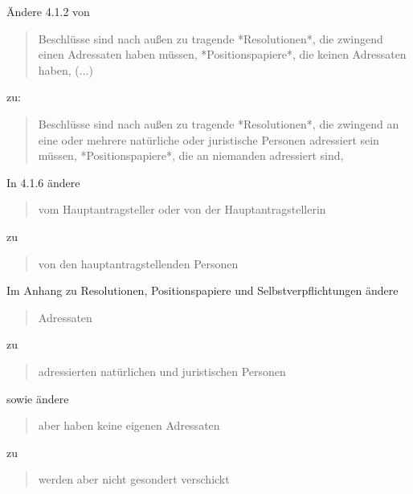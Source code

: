 \documentclass[draft,10pt,oneside]{scrartcl}
\begin{document}
Ändere 4.1.2 von
\begin{quote}
    Beschlüsse sind nach außen zu tragende *Resolutionen*, die zwingend einen
    Adressaten haben müssen, *Positionspapiere*, die keinen Adressaten haben, (...)
\end{quote}
zu:
\begin{quote}
    Beschlüsse sind nach außen zu tragende *Resolutionen*, die zwingend an
    eine oder mehrere natürliche oder juristische Personen adressiert sein
    müssen, *Positionspapiere*, die an niemanden adressiert sind,
\end{quote}

In 4.1.6 ändere
\begin{quote}
    vom Hauptantragsteller oder von der Hauptantragstellerin
\end{quote}
zu
\begin{quote}
    von den hauptantragstellenden Personen
\end{quote}

Im Anhang zu Resolutionen, Positionspapiere und Selbstverpflichtungen ändere
\begin{quote}
    Adressaten
\end{quote}
zu
\begin{quote}
    adressierten natürlichen und juristischen Personen
\end{quote}
sowie ändere
\begin{quote}
    aber haben keine eigenen Adressaten
\end{quote}
zu
\begin{quote}
    werden aber nicht gesondert verschickt
\end{quote}
\end{document}
